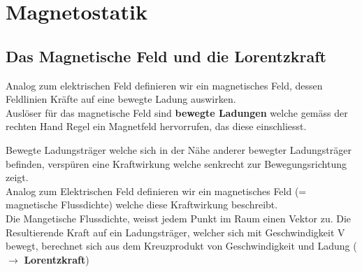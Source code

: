 %
%
%
%
%
\newpage
\section{Magnetostatik}
\subsection{Das Magnetische Feld und die Lorentzkraft}

	Analog zum elektrischen Feld definieren wir ein magnetisches Feld, dessen Feldlinien Kräfte auf eine bewegte Ladung auswirken. \\
	Auslöser für das magnetische Feld sind \textbf{bewegte Ladungen} welche gemäss der rechten Hand Regel ein Magnetfeld hervorrufen, das diese einschliesst. \\
\begin{center}


	\end{center}
	\beginip
	Bewegte Ladungsträger welche sich in der Nähe anderer bewegter Ladungsträger befinden, verspüren eine Kraftwirkung welche senkrecht zur Bewegungsrichtung zeigt. \\
	Analog zum Elektrischen Feld definieren wir ein magnetisches Feld (= magnetische Flussdichte) welche diese Kraftwirkung beschreibt. \\
	Die Mangetische Flussdichte, weisst jedem Punkt im Raum einen Vektor zu. Die Resultierende Kraft auf ein Ladungsträger, welcher sich mit Geschwindigkeit V bewegt,
	berechnet sich aus dem Kreuzprodukt von Geschwindigkeit und Ladung ($\rightarrow$ \textbf{Lorentzkraft})
	\iend




